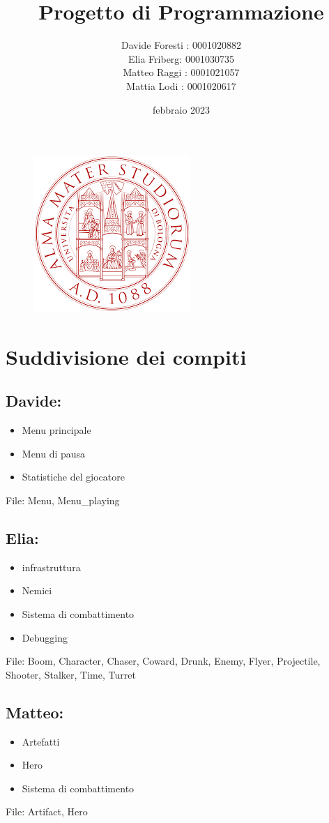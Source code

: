 \documentclass[12pt]{article}
\title{\textbf{Progetto di Programmazione}}
\author{Davide Foresti : 0001020882\\
        Elia Friberg: 0001030735\\
        Matteo Raggi : 0001021057\\
        Mattia Lodi : 0001020617}
\date{febbraio 2023}
\begin{document}
\maketitle

\begin{figure}[h]
    \centering
    \includegraphics{logo.png}
\end{figure}

\newpage


\section{Suddivisione dei compiti}
\subsection*{Davide:}
\begin{itemize}
    \item Menu principale
    \item Menu di pausa
    \item Statistiche del giocatore
\end{itemize}
File: Menu, Menu\_playing
 
\subsection*{Elia:}
\begin{itemize}
    \item infrastruttura
    \item Nemici 
    \item Sistema di combattimento
    \item Debugging
\end{itemize}
File: Boom, Character, Chaser, Coward, Drunk, Enemy, Flyer, Projectile, Shooter, Stalker, Time, Turret

\subsection*{Matteo:}
\begin{itemize}
    \item Artefatti
    \item Hero
    \item Sistema di combattimento
\end{itemize}
File: Artifact, Hero
\end{document}
